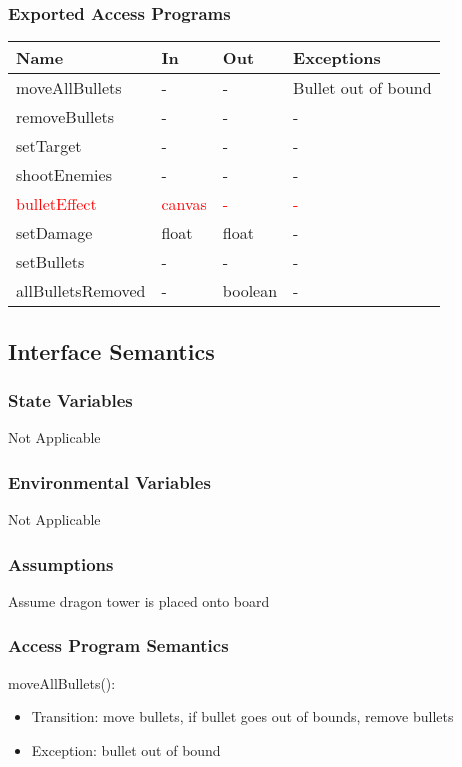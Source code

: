 \documentclass[12,english]{article}
\begin{document}
\subsubsection{Exported Access Programs}
\begin{table}[h!]
    \centering
    \begin{tabular}{|p{4cm}|p{2cm}|p{2cm}|p{2cm}|}
    \hline
    \textbf {Name}  & {In} & {Out} & {Exceptions} \\
    \hline
    moveAllBullets & - & - & Bullet out of bound\\
    \hline
    removeBullets & - & - & -\\
    \hline 
    setTarget & - & - & -\\
    \hline
    shootEnemies & - & - & -\\
    \hline
    \textcolor{red}{bulletEffect} & \textcolor{red}{canvas} & \textcolor{red}{-} & \textcolor{red}{-}\\
    \hline
    setDamage & float & float & -\\
    \hline
    setBullets & - & - & -\\
    \hline
    allBulletsRemoved & - & boolean & -\\
    \hline
    \end{tabular}
\end{table}
\subsection{Interface Semantics}
\subsubsection{State Variables}
Not Applicable
\subsubsection{Environmental Variables}
Not Applicable
\subsubsection{Assumptions}
Assume dragon tower is placed onto board
\subsubsection{Access Program Semantics}

\noindent moveAllBullets():
\begin{itemize}
    \item Transition: move bullets, if bullet goes out of bounds, remove bullets
    \item Exception: bullet out of bound
\end{itemize}
\end{document}
